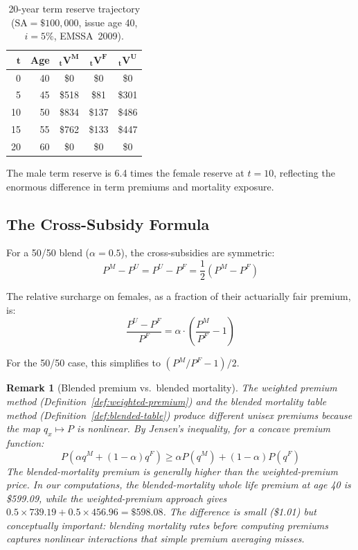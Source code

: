 \documentclass[12pt,a4paper]{article}
\newtheorem{remark}[definition]{Remark}
\newcommand{\qx}[1]{q_{#1}}
\newcommand{\SA}{\text{SA}}
\begin{document}
\begin{table}[H]
\centering
\caption{20-year term reserve trajectory ($\SA = \$100{,}000$, issue age 40,
$i = 5\%$, EMSSA~2009).}
\label{tab:reserves-term}
\begin{tabular}{rrccc}
\toprule
$\bm{t}$ & \textbf{Age} & $\bm{{}_tV^M}$ & $\bm{{}_tV^F}$ & $\bm{{}_tV^U}$ \\
\midrule
 0 & 40 & \$0 & \$0 & \$0 \\
 5 & 45 & \$518 & \$81 & \$301 \\
10 & 50 & \$834 & \$137 & \$486 \\
15 & 55 & \$762 & \$133 & \$447 \\
20 & 60 & \$0 & \$0 & \$0 \\
\bottomrule
\end{tabular}
\end{table}

The male term reserve is 6.4 times the female reserve at $t = 10$, reflecting
the enormous difference in term premiums and mortality exposure.

\subsection{The Cross-Subsidy Formula}
\label{subsec:cross-subsidy-formula}

For a 50/50 blend ($\alpha = 0.5$), the cross-subsidies are symmetric:
\begin{equation}
\label{eq:cross-subsidy}
  P^M - P^U = P^U - P^F = \frac{1}{2}(P^M - P^F)
\end{equation}

The relative surcharge on females, as a fraction of their actuarially fair
premium, is:
\begin{equation}
\label{eq:relative-surcharge}
  \frac{P^U - P^F}{P^F}
  = \alpha \cdot \left(\frac{P^M}{P^F} - 1\right)
\end{equation}

For the 50/50 case, this simplifies to $(P^M/P^F - 1)/2$.

\begin{remark}[Blended premium vs.\ blended mortality]
The weighted premium method (Definition~\ref{def:weighted-premium}) and the
blended mortality table method (Definition~\ref{def:blended-table}) produce
different unisex premiums because the map $\qx{x} \mapsto P$ is nonlinear.
By Jensen's inequality, for a concave premium function:
\begin{equation}
  P(\alpha \qx{}^M + (1-\alpha)\qx{}^F) \geq \alpha P(\qx{}^M) + (1-\alpha) P(\qx{}^F)
\end{equation}
The blended-mortality premium is generally \emph{higher} than the
weighted-premium price. In our computations, the blended-mortality whole life
premium at age 40 is \$599.09, while the weighted-premium approach gives
$0.5 \times 739.19 + 0.5 \times 456.96 = \$598.08$. The difference is small
(\$1.01) but conceptually important: blending mortality rates before computing
premiums captures nonlinear interactions that simple premium averaging misses.
\end{remark}
\end{document}
